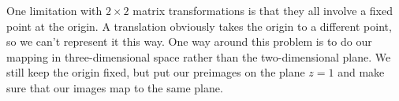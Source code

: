 \documentclass[../textbook.tex]{subfiles}
\begin{document}
\begin{enumerate}
\begin{enumerate}
\begin{multicols}{4}
\item {}
\item {}
\item {}
\item {}
\item {}
\item {}
\item {}
\item {}
\item {}
\item {}
\item {}
\item {}
\end{multicols}
\end{enumerate}
\setcounter{problem_i}{\value{enumi}}
\end{enumerate}

\noindent One limitation with $2\times 2$ matrix transformations is that they all involve a fixed point at the origin. A translation obviously takes the origin to a different point, so we can't represent it this way. One way around this problem is to do our mapping in three-dimensional space rather than the two-dimensional plane. We still keep the origin fixed, but put our preimages on the plane $z=1$ and make sure that our images map to the same plane.
\end{document}
